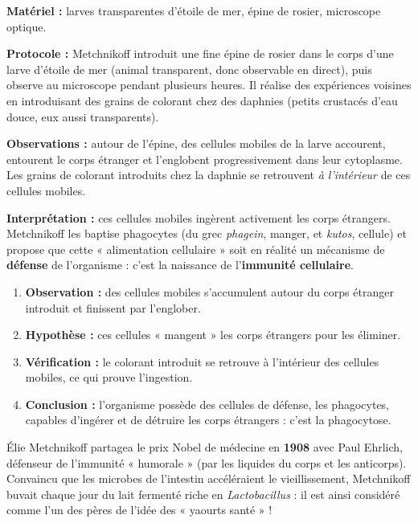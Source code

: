 \documentclass[11pt]{article}
\newcommand{\cle}[1]{{\popxbold\color{popdark}#1}}
\begin{document}
\begin{experience}
\textbf{Matériel :} larves transparentes d'étoile de mer, épine de rosier, microscope optique.

\textbf{Protocole :} Metchnikoff introduit une fine épine de rosier dans le corps d'une larve d'étoile de mer (animal transparent, donc observable en direct), puis observe au microscope pendant plusieurs heures. Il réalise des expériences voisines en introduisant des grains de colorant chez des daphnies (petits crustacés d'eau douce, eux aussi transparents).

\textbf{Observations :} autour de l'épine, des cellules mobiles de la larve accourent, entourent le corps étranger et l'englobent progressivement dans leur cytoplasme. Les grains de colorant introduits chez la daphnie se retrouvent \emph{à l'intérieur} de ces cellules mobiles.

\textbf{Interprétation :} ces cellules mobiles ingèrent activement les corps étrangers. Metchnikoff les baptise \cle{phagocytes} (du grec \emph{phagein}, manger, et \emph{kutos}, cellule) et propose que cette « alimentation cellulaire » soit en réalité un mécanisme de \textbf{défense} de l'organisme : c'est la naissance de l'\textbf{immunité cellulaire}.
\end{experience}

\begin{methode}
\begin{enumerate}
\item \textbf{Observation :} des cellules mobiles s'accumulent autour du corps étranger introduit et finissent par l'englober.
\item \textbf{Hypothèse :} ces cellules « mangent » les corps étrangers pour les éliminer.
\item \textbf{Vérification :} le colorant introduit se retrouve à l'intérieur des cellules mobiles, ce qui prouve l'ingestion.
\item \textbf{Conclusion :} l'organisme possède des cellules de défense, les phagocytes, capables d'ingérer et de détruire les corps étrangers : c'est la phagocytose.
\end{enumerate}
\end{methode}

\begin{savaistu}
Élie Metchnikoff partagea le prix Nobel de médecine en \textbf{1908} avec Paul Ehrlich, défenseur de l'immunité « humorale » (par les liquides du corps et les anticorps). Convaincu que les microbes de l'intestin accéléraient le vieillissement, Metchnikoff buvait chaque jour du lait fermenté riche en \emph{Lactobacillus} : il est ainsi considéré comme l'un des pères de l'idée des « yaourts santé » !
\end{savaistu}
\end{document}
